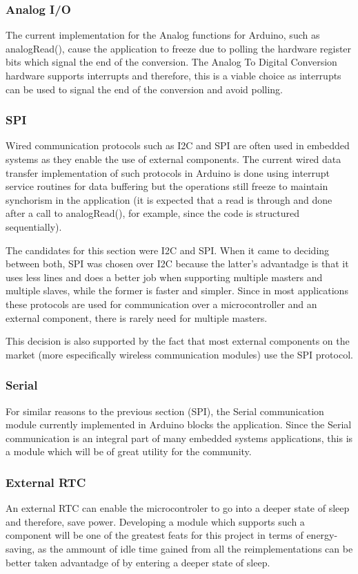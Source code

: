 \documentclass{article}
\begin{document}
\subsubsection{Analog I/O}
\tab The current implementation for the Analog functions for Arduino, such as analogRead(), cause the application to freeze due to polling the hardware register bits which signal the end of the conversion. The Analog To Digital Conversion hardware supports interrupts and therefore, this is a viable choice as interrupts can be used to signal the end of the conversion and avoid polling.
\subsubsection{SPI}
\tab Wired communication protocols such as I2C and SPI are often used in embedded systems as they enable the use of external components. The current wired data transfer implementation of such protocols in Arduino is done using interrupt service routines for data buffering but the operations still freeze to maintain synchorism in the application (it is expected that a read is through and done after a call to analogRead(), for example, since the code is structured sequentially).
\par The candidates for this section were I2C and SPI. When it came to deciding between both, SPI was chosen over I2C because the latter's advantadge is that it uses less lines and does a better job when supporting multiple masters and multiple slaves, while the former is faster and simpler. Since in most applications these protocols are used for communication over a microcontroller and an external component, there is rarely need for multiple masters. 
\par This decision is also supported by the fact that most external components on the market (more especifically wireless communication modules) use the SPI protocol.
\subsubsection{Serial}
\tab For similar reasons to the previous section (SPI), the Serial communication module currently implemented in Arduino blocks the application. Since the Serial communication is an integral part of many embedded systems applications, this is a module which will be of great utility for the community.
\subsubsection{External RTC}
\tab An external RTC can enable the microcontroler to go into a deeper state of sleep and therefore, save power. Developing a module which supports such a component will be one of the greatest feats for this project in terms of energy-saving, as the ammount of idle time gained from all the reimplementations can be better taken advantadge of by entering a deeper state of sleep.
\end{document}
